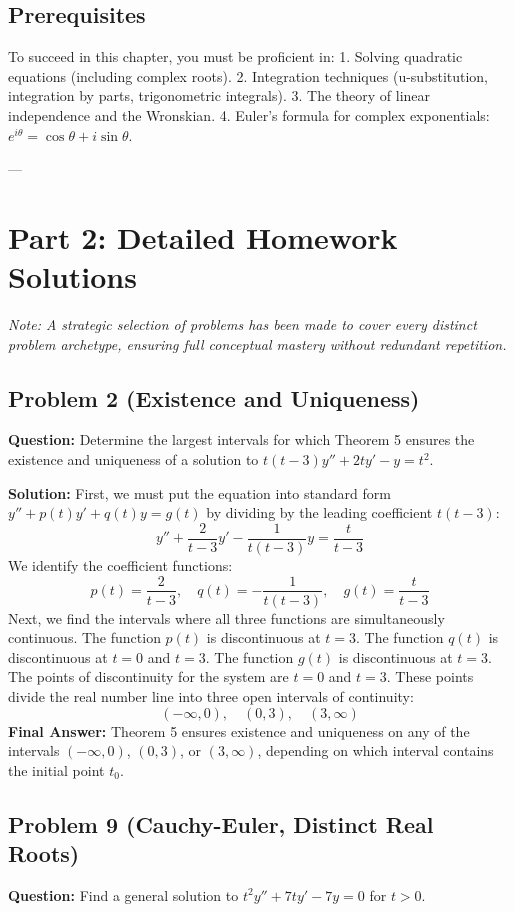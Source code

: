 \documentclass{article}
\begin{document}
\subsection{Prerequisites}
To succeed in this chapter, you must be proficient in:
1. Solving quadratic equations (including complex roots).
2. Integration techniques (u-substitution, integration by parts, trigonometric integrals).
3. The theory of linear independence and the Wronskian.
4. Euler's formula for complex exponentials: $e^{i\theta} = \cos\theta + i\sin\theta$.

---

\section{Part 2: Detailed Homework Solutions}
\textit{Note: A strategic selection of problems has been made to cover every distinct problem archetype, ensuring full conceptual mastery without redundant repetition.}

\subsection{Problem 2 (Existence and Uniqueness)}
\textbf{Question:} Determine the largest intervals for which Theorem 5 ensures the existence and uniqueness of a solution to $t(t-3)y'' + 2ty' - y = t^2$.

\textbf{Solution:}
First, we must put the equation into standard form $y'' + p(t)y' + q(t)y = g(t)$ by dividing by the leading coefficient $t(t-3)$:
\[ y'' + \frac{2}{t-3}y' - \frac{1}{t(t-3)}y = \frac{t}{t-3} \]
We identify the coefficient functions:
\[ p(t) = \frac{2}{t-3}, \quad q(t) = -\frac{1}{t(t-3)}, \quad g(t) = \frac{t}{t-3} \]
Next, we find the intervals where all three functions are simultaneously continuous.
The function $p(t)$ is discontinuous at $t = 3$.
The function $q(t)$ is discontinuous at $t = 0$ and $t = 3$.
The function $g(t)$ is discontinuous at $t = 3$.
The points of discontinuity for the system are $t = 0$ and $t = 3$. These points divide the real number line into three open intervals of continuity:
\[ (-\infty, 0), \quad (0, 3), \quad (3, \infty) \]
\textbf{Final Answer:} Theorem 5 ensures existence and uniqueness on any of the intervals $(-\infty, 0)$, $(0, 3)$, or $(3, \infty)$, depending on which interval contains the initial point $t_0$.

\subsection{Problem 9 (Cauchy-Euler, Distinct Real Roots)}
\textbf{Question:} Find a general solution to $t^2 y'' + 7ty' - 7y = 0$ for $t > 0$.
\end{document}
